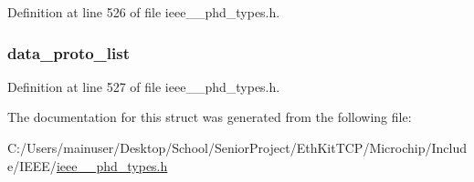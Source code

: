 Definition at line 526 of file ieee\+\_\+\_\+phd\+\_\+types.\+h.

\hypertarget{struct___a_a_r_q__apdu_aeb3588fffc08c980254b2edd07a8ef74}{}
\subsubsection[{data\+\_\+proto\+\_\+list}]{ data\+\_\+proto\+\_\+list}\label{struct___a_a_r_q__apdu_aeb3588fffc08c980254b2edd07a8ef74}


Definition at line 527 of file ieee\+\_\+\_\+phd\+\_\+types.\+h.



The documentation for this struct was generated from the following file\+:\begin{DoxyCompactItemize}
\item 
C\+:/\+Users/mainuser/\+Desktop/\+School/\+Senior\+Project/\+Eth\+Kit\+T\+C\+P/\+Microchip/\+Include/\+I\+E\+E\+E/\hyperlink{ieee__11073__phd__types_8h}{ieee\+\_\+\_\+phd\+\_\+types.\+h}\end{DoxyCompactItemize}
